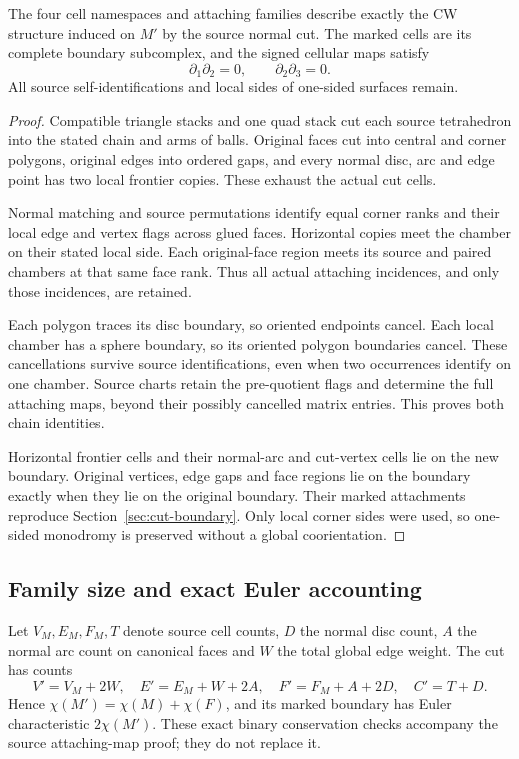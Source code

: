 \begin{proposition}
The four cell namespaces and attaching families describe exactly the CW
structure induced on $M'$ by the source normal cut. The marked cells are its
complete boundary subcomplex, and the signed cellular maps satisfy
\[
             \partial_1\partial_2=0,\qquad \partial_2\partial_3=0.
\]
All source self-identifications and local sides of one-sided surfaces remain.
\end{proposition}
\begin{proof}
Compatible triangle stacks and one quad stack cut each source tetrahedron
into the stated chain and arms of balls. Original faces cut into central
and corner polygons, original edges into ordered gaps, and every normal
disc, arc and edge point has two local frontier copies. These exhaust the
actual cut cells.

Normal matching and source permutations identify equal corner ranks and
their local edge and vertex flags across glued faces. Horizontal copies
meet the chamber on their stated local side. Each original-face region
meets its source and paired chambers at that same face rank. Thus all actual
attaching incidences, and only those incidences, are retained.

Each polygon traces its disc boundary, so oriented endpoints cancel. Each
local chamber has a sphere boundary, so its oriented polygon boundaries
cancel. These cancellations survive source identifications, even when two
occurrences identify on one chamber. Source charts retain the pre-quotient
flags and determine the full attaching maps, beyond their possibly cancelled
matrix entries. This proves both chain identities.

Horizontal frontier cells and their normal-arc and cut-vertex cells lie
on the new boundary. Original vertices, edge gaps and face regions lie
on the boundary exactly when they lie on the original boundary. Their marked
attachments reproduce Section~\ref{sec:cut-boundary}. Only local corner sides
were used, so one-sided monodromy is preserved without a global coorientation.
\end{proof}

\subsection{Family size and exact Euler accounting}

Let $V_M,E_M,F_M,T$ denote source cell counts, $D$ the normal disc count,
$A$ the normal arc count on canonical faces and $W$ the total global
edge weight. The cut has counts
\[
V'=V_M+2W,\quad E'=E_M+W+2A,\quad F'=F_M+A+2D,\quad C'=T+D.
\]
Hence $\chi(M')=\chi(M)+\chi(F)$, and its marked boundary has Euler
characteristic $2\chi(M')$. These exact binary conservation checks accompany
the source attaching-map proof; they do not replace it.

